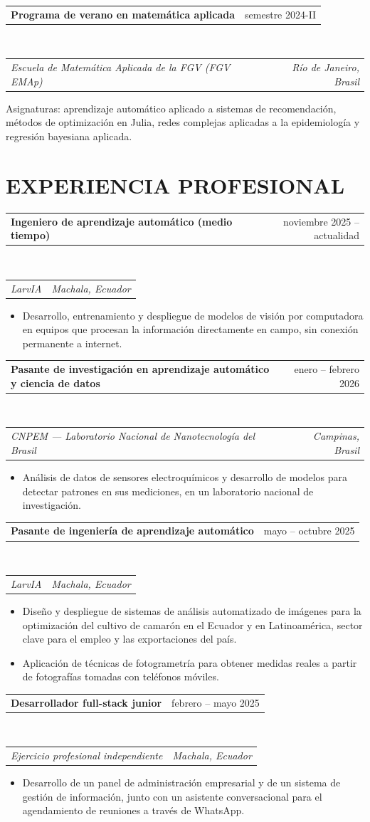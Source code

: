 \documentclass[letterpaper,10pt]{article}
\makeatletter
\newcommand{\fila}[2]{%
  \begin{tabular*}{\textwidth}{@{}l@{\extracolsep{\fill}}r@{}}
    #1 & #2 \\
  \end{tabular*}%
}
\newcommand{\entrada}[4]{%
  \fila{\textbf{#1}}{#2}\\[1pt]
  \fila{\textit{#3}}{\textit{#4}}\vspace{1pt}%
}
\newenvironment{vinetas}
  {\begin{itemize}[leftmargin=1.4em,label=$\bullet$,itemsep=0.5pt,topsep=1pt,parsep=0pt,partopsep=0pt]}
  {\end{itemize}\vspace{1pt}}
\makeatother
\begin{document}
\entrada{Programa de verano en matemática aplicada}{semestre 2024-II}
        {Escuela de Matemática Aplicada de la FGV (FGV EMAp)}{Río de Janeiro, Brasil}
Asignaturas: aprendizaje automático aplicado a sistemas de recomendación,
métodos de optimización en Julia, redes complejas aplicadas a la epidemiología
y regresión bayesiana aplicada.

\section*{EXPERIENCIA PROFESIONAL}

\entrada{Ingeniero de aprendizaje automático (medio tiempo)}{noviembre 2025 -- actualidad}
        {LarvIA}{Machala, Ecuador}
\begin{vinetas}
  \item Desarrollo, entrenamiento y despliegue de modelos de visión por
        computadora en equipos que procesan la información directamente en
        campo, sin conexión permanente a internet.
\end{vinetas}

\entrada{Pasante de investigación en aprendizaje automático y ciencia de datos}{enero -- febrero 2026}
        {CNPEM --- Laboratorio Nacional de Nanotecnología del Brasil}{Campinas, Brasil}
\begin{vinetas}
  \item Análisis de datos de sensores electroquímicos y desarrollo de modelos
        para detectar patrones en sus mediciones, en un laboratorio nacional
        de investigación.
\end{vinetas}

\entrada{Pasante de ingeniería de aprendizaje automático}{mayo -- octubre 2025}
        {LarvIA}{Machala, Ecuador}
\begin{vinetas}
  \item Diseño y despliegue de sistemas de análisis automatizado de imágenes
        para la optimización del cultivo de camarón en el Ecuador y en
        Latinoamérica, sector clave para el empleo y las exportaciones del
        país.
  \item Aplicación de técnicas de fotogrametría para obtener medidas reales a
        partir de fotografías tomadas con teléfonos móviles.
\end{vinetas}

\entrada{Desarrollador full-stack junior}{febrero -- mayo 2025}
        {Ejercicio profesional independiente}{Machala, Ecuador}
\begin{vinetas}
  \item Desarrollo de un panel de administración empresarial y de un sistema
        de gestión de información, junto con un asistente conversacional para
        el agendamiento de reuniones a través de WhatsApp.
\end{vinetas}
\end{document}
